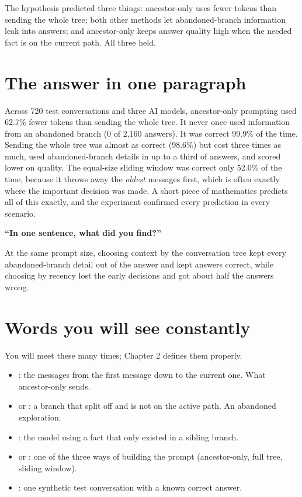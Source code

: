 The hypothesis predicted three things: ancestor-only uses fewer tokens than sending the whole tree; both other methods let abandoned-branch information leak into answers; and ancestor-only keeps answer quality high when the needed fact is on the current path. All three held.

\section{The answer in one paragraph}

Across 720 test conversations and three AI models, ancestor-only prompting used 62.7\% fewer tokens than sending the whole tree. It never once used information from an abandoned branch (0 of 2,160 answers). It was correct 99.9\% of the time. Sending the whole tree was almost as correct (98.6\%) but cost three times as much, used abandoned-branch details in up to a third of answers, and scored lower on quality. The equal-size sliding window was correct only 52.0\% of the time, because it throws away the \emph{oldest} messages first, which is often exactly where the important decision was made. A short piece of mathematics predicts all of this exactly, and the experiment confirmed every prediction in every scenario.

\begin{ask}
\textbf{``In one sentence, what did you find?''}\par
At the same prompt size, choosing context by the conversation tree kept every abandoned-branch detail out of the answer and kept answers correct, while choosing by recency lost the early decisions and got about half the answers wrong.
\end{ask}

\section{Words you will see constantly}

You will meet these many times; Chapter 2 defines them properly.
\begin{itemize}
\item {}: the messages from the first message down to the current one. What ancestor-only sends.
\item {} or : a branch that split off and is not on the active path. An abandoned exploration.
\item {}: the model using a fact that only existed in a sibling branch.
\item {} or : one of the three ways of building the prompt (ancestor-only, full tree, sliding window).
\item {}: one synthetic test conversation with a known correct answer.
\end{itemize}
